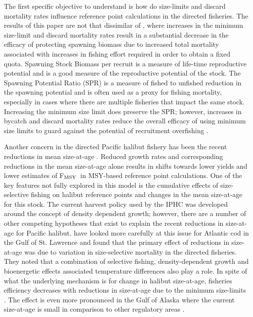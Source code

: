 \documentclass[12pt,leqno]{article}
\newcommand{\fmsy}{F$_{\textnormal{MSY}}$}
\begin{document}
The first specific objective to understand is how do size-limits and discard mortality rates influence reference point calculations in the directed fisheries.  The results of this paper are not that dissimilar of \cite{coggins2007ecm}, where increases in the minimum size-limit and discard mortality rates result in a substantial decrease in the efficacy of protecting spawning biomass due to increased total mortality associated with increases in fishing effort required in order to obtain a fixed quota.  Spawning Stock Biomass per recruit is a measure of life-time reproductive potential and is a good measure of the reproductive potential of the stock.  The Spawning Potential Ratio (SPR) is a measure of fished to unfished reduction in the spawning potential and is often used as a proxy for fishing mortality, especially in cases where there are multiple fisheries that impact the same stock. Increasing the minimum size limit does preserve the SPR; however, increases in bycatch and discard mortality rates reduce the overall efficacy of using minimum size limits to guard against the potential of recruitment overfishing \citep{pineiii2008car}.

Another concern in the directed Pacific halibut fishery has been the recent reductions in mean size-at-age \citep{clark1999decadal,martell2013:ohr}.  Reduced growth rates and corresponding reductions in the mean size-at-age alone results in shifts towards lower yields and lower estimates of \fmsy\ in MSY-based reference point calculations.  One of the key features not fully explored in this model is the cumulative effects of size-selective fishing on halibut reference points and changes in the mean size-at-age for this stock.  The current harvest policy used by the IPHC was developed around the concept of density dependent growth; however, there are a number of other competing hypotheses that exist to explain the recent reductions in size-at-age for Pacific halibut.  \cite{sinclair2002disentangling} have looked more carefully at this issue for Atlantic cod in the Gulf of St. Lawrence and found that the primary effect of reductions in size-at-age was due to variation in size-selective mortality in the directed fisheries.  They noted that a combination of selective fishing, density-dependent growth and bioenergetic effects associated temperature differences also play a role.  In spite of what the underlying mechanism is for change in halibut size-at-age, fisheries efficiency decreases with reductions in size-at-age due to the minimum size-limits \citep{clark1995re}.  The effect is even more pronounced in the Gulf of Alaska where the current size-at-age is small in comparison to other regulatory areas \citep{Stewart2014}.
\end{document}
